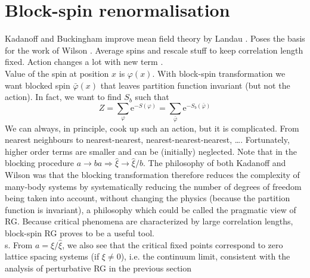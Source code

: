 \section{Block-spin renormalisation}
\label{sec:blockspin}
Kadanoff and Buckingham \cite{PhysicsPhysiqueFizika_2_263,Buckingham1961} improve mean field theory by Landau \cite{Landau:1937obd}. Poses the basis for the work of Wilson \cite{WilsonRG1,WilsonRG2,WilsonFisher}. Average spins and rescale stuff to keep correlation length fixed. Action changes a lot with new term \cite{cardy_1996}. \\
Value of the spin at position $x$ is $\varphi(x)$. With block-spin transformation we want blocked spin $\bar\varphi(x)$ that leaves partition function invariant (but not the action). In fact, we want to find $S_b$ such that 
\begin{equation}
    Z=\sum_{\varphi} \mathrm{e}^{-S(\varphi)}= \sum_{\bar\varphi} \mathrm{e}^{-S_b\left(\bar\varphi\right)}
\end{equation}
We can always, in principle, cook up such an action, but it is complicated. From nearest neighbours to nearest-nearest, nearest-nearest-nearest, \dots. Fortunately, higher order terms are smaller and can be (initially) neglected.
Note that in the blocking procedure $a \to ba \Rightarrow \hat\xi \to \hat\xi/b$.
The philosophy of both Kadanoff
and Wilson was that the blocking transformation therefore reduces the complexity of many-body
systems by systematically reducing the number of degrees of freedom being taken into account,
without changing the physics \cite{WILSON197475} (because the partition function is invariant), a philosophy which
could be called the pragmatic view of RG. Because critical phenomena are characterized by large
correlation lengths, block-spin RG proves to be a useful tool. \\
s. From $a = \xi / \hat\xi$, we also see that the critical fixed points correspond to zero lattice
spacing systems (if $\xi \neq 0$), i.e. the continuum limit, consistent with the analysis of perturbative
RG in the previous section

